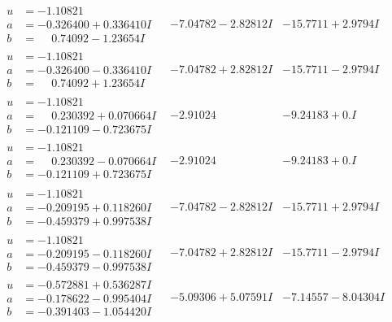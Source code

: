 \documentclass[1p]{elsarticle_modified}
\theoremstyle{definition}
\begin{document}
$$\begin{array}{c|c|c}
\begin{aligned}
u &= -1.10821\phantom{ +0.000000I} \\
a &= -0.326400 + 0.336410 I \\
b &= \phantom{-}0.74092 - 1.23654 I\end{aligned}
 & -7.04782 - 2.82812 I & -15.7711 + 2.9794 I \\ \hline\begin{aligned}
u &= -1.10821\phantom{ +0.000000I} \\
a &= -0.326400 - 0.336410 I \\
b &= \phantom{-}0.74092 + 1.23654 I\end{aligned}
 & -7.04782 + 2.82812 I & -15.7711 - 2.9794 I \\ \hline\begin{aligned}
u &= -1.10821\phantom{ +0.000000I} \\
a &= \phantom{-}0.230392 + 0.070664 I \\
b &= -0.121109 - 0.723675 I\end{aligned}
 & -2.91024\phantom{ +0.000000I} & -9.24183 + 0. I\phantom{ +0.000000I} \\ \hline\begin{aligned}
u &= -1.10821\phantom{ +0.000000I} \\
a &= \phantom{-}0.230392 - 0.070664 I \\
b &= -0.121109 + 0.723675 I\end{aligned}
 & -2.91024\phantom{ +0.000000I} & -9.24183 + 0. I\phantom{ +0.000000I} \\ \hline\begin{aligned}
u &= -1.10821\phantom{ +0.000000I} \\
a &= -0.209195 + 0.118260 I \\
b &= -0.459379 + 0.997538 I\end{aligned}
 & -7.04782 - 2.82812 I & -15.7711 + 2.9794 I \\ \hline\begin{aligned}
u &= -1.10821\phantom{ +0.000000I} \\
a &= -0.209195 - 0.118260 I \\
b &= -0.459379 - 0.997538 I\end{aligned}
 & -7.04782 + 2.82812 I & -15.7711 - 2.9794 I \\ \hline\begin{aligned}
u &= -0.572881 + 0.536287 I \\
a &= -0.178622 - 0.995404 I \\
b &= -0.391403 - 1.054420 I\end{aligned}
 & -5.09306 + 5.07591 I & -7.14557 - 8.04304 I \\ \hline\begin{aligned}

\end{aligned}
\end{array}$$
\end{document}
